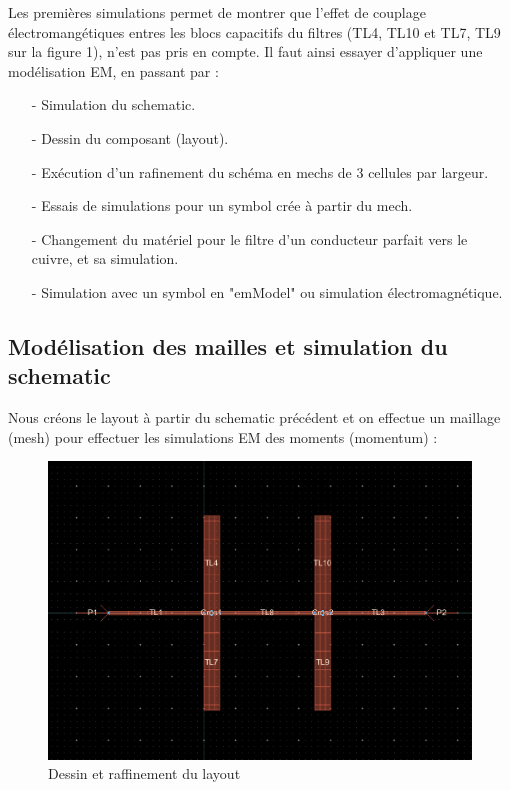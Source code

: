 \documentclass[a4paper]{article}
\begin{document}

Les premi\`eres simulations permet de montrer que l'effet de couplage \'electromang\'etiques entres les blocs capacitifs du filtres
(TL4, TL10 et TL7, TL9 sur la figure 1), n'est pas pris en compte. Il faut ainsi essayer d'appliquer une mod\'elisation EM,
en passant par :
\begin{itemize} \itemsep -3pt
  \item [-] Simulation du schematic.
  \item [-] Dessin du composant (layout).
  \item [-] Ex\'ecution d'un rafinement du sch\'ema en mechs de 3 cellules par largeur.
  \item [-] Essais de simulations pour un symbol cr\'ee \`a partir du mech.
  \item [-] Changement du mat\'eriel pour le filtre d'un conducteur parfait vers le cuivre, et sa simulation.
  \item[-] Simulation avec un symbol en "emModel" ou simulation \'electromagn\'etique.
\end{itemize}

\subsection{Mod\'elisation des mailles et simulation du schematic}
Nous cr\'eons le layout \`a partir du schematic pr\'ec\'edent et on effectue un maillage (mesh) pour
effectuer les simulations EM des moments (momentum) :

\begin{figure}[!htb]
\begin{center}
  \includegraphics[scale=0.35]{filter_layout.png}
  \caption{Dessin et raffinement du layout}
\end{center}
\end{figure}
\end{document}
